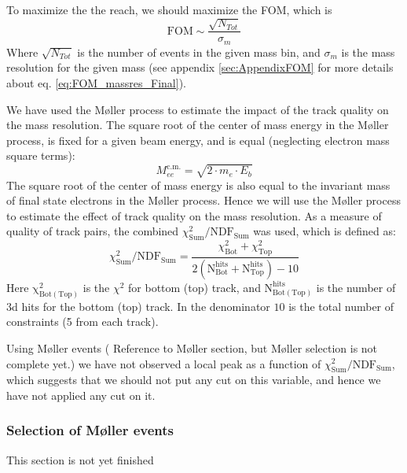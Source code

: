 \documentclass[letterpaper,12pt]{article}
\def \dstl {\displaystyle}
\def \Mlr {M\o ller }
\begin{document}
To maximize the the reach, we should maximize the FOM, which is 
\begin{equation}
 \mathrm{FOM} \sim \frac{\dstl \sqrt{N_{Tot}}}{\dstl \sigma_{m}}
 \label{eq:FOM_massres_Final}
\end{equation}
Where $\dstl \sqrt{N_{Tot}}$ is the number of events in the given mass bin, and 
$\dstl \sigma_{m}$ is the mass resolution for the given mass (see appendix \ref{sec:AppendixFOM} for more details about eq. \ref{eq:FOM_massres_Final}).

We have used the \Mlr process to estimate the impact of the track quality on the mass resolution. The square root of the center of mass energy in the \Mlr process, is fixed for a given beam energy, and is equal (neglecting electron mass square terms):
\begin{equation}
 \dstl M_{ee}^{\mathrm{c.m.}} = \sqrt{2\cdot m_{e}\cdot E_{b}}
\end{equation}
The square root of the center of mass energy is also equal to the invariant mass of final state electrons in the \Mlr process. Hence we will use the \Mlr process to estimate the effect of track quality on the mass resolution. As a measure of quality of track pairs, the  combined $\chi^{2}_{\mathrm{Sum}}/\mathrm{NDF_{Sum}}$ was used, which is defined as:
\begin{equation}
    \chi^{2}_{\mathrm{Sum}}/\mathrm{NDF_{Sum}} = \frac{\dstl \chi^{2}_{ \mathrm{Bot}} + \chi^{2}_{\mathrm{Top}} }{ \mathrm{\dstl 2\left(N_{Bot}^{hits} + N_{Top}^{hits}\right) - 10}}
\end{equation}
Here $\mathrm{\chi^{2}_{Bot(Top)}}$ is the $\chi^{2}$ for bottom (top) track, and 
$\mathrm{ N^{hits}_{Bot(Top) } }$ is the number of 3d hits for the bottom (top) track.
In the denominator $10$ is the total number of constraints (5 from each track).

Using \Mlr events ({\color{Red} Reference to \Mlr section, but \Mlr selection is not complete yet.}) we have not observed a local peak as a function of 
$\chi^{2}_{\mathrm{Sum}}/\mathrm{NDF_{Sum}}$, which suggests that we should not put
any cut on this variable, and hence we have not applied any cut on it.

\subsubsection{Selection of \Mlr events}
{\color{Red} This section is not yet finished}
\end{document}
